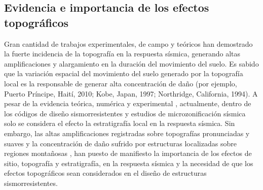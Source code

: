 \documentclass[spanish,letterpaper,12pt,twoside,openany]{article}
\begin{document}
\subsection{Evidencia e importancia de los efectos topográficos}
%
Gran cantidad de trabajos experimentales, de campo y teóricos han demostrado la fuerte incidencia de la topografía en la respuesta sísmica, generando altas  amplificaciones y alargamiento en la duración del movimiento del suelo. Es sabido que la variación espacial del movimiento del suelo generado por la topografía local es la responsable de generar alta concentración de daño (por ejemplo, Puerto Príncipe, Haití, 2010; Kobe, Japan, 1997; Northridge, California, 1994). A pesar de la evidencia teórica, numérica y experimental \citep[por ejemplo en][entre otros]{Assimaki2013, Ashford1997, Aki1993, Barani2014}, actualmente, dentro de los códigos de diseño sismorresistentes y estudios de microzonificación sísmica solo se considera el efecto la estratigrafía local \citep{Kaklamanos2015, Parvez2014, Stewart2014, Idriss1992user, Schnabel1972shake} en la respuesta sísmica. Sin embargo, las altas amplificaciones registradas sobre topografías pronunciadas y suaves \citep{spudich1996directional, Griffiths1979} y la concentración de daño sufrido por estructuras localizadas sobre regiones montañosas \citep{assimaki2005soil, assimaki2005effects, Hough2011, Assimaki2013}, han puesto de manifiesto la importancia de los efectos de sitio, topografía y estratigrafía, en la respuesta sísmica y la necesidad de que los efectos topográficos sean considerados en el diseño de estructuras sismorresistentes.
\end{document}
